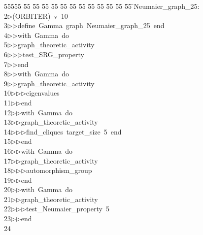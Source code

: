 %
%
\begin{tabbing}
55555 \= 55 \= 55 \= 55 \= 55 \= 55 \= 55 \= 55 \= 55 \= 55 \= 55 \= 55 \= 55 \= \>Neumaier\_graph\_25:\\[0pt]
2\>$\triangleright$\>(ORBITER)\ v\ 10\ \\[0pt]
3\>$\triangleright$\>$\triangleright$\>define\ Gamma\ graph\ Neumaier\_graph\_25\ end\ \\[0pt]
4\>$\triangleright$\>$\triangleright$\>with\ Gamma\ do\ \\[0pt]
5\>$\triangleright$\>$\triangleright$\>graph\_theoretic\_activity\ \\[0pt]
6\>$\triangleright$\>$\triangleright$\>$\triangleright$\>test\_SRG\_property\ \\[0pt]
7\>$\triangleright$\>$\triangleright$\>end\ \\[0pt]
8\>$\triangleright$\>$\triangleright$\>with\ Gamma\ do\ \\[0pt]
9\>$\triangleright$\>$\triangleright$\>graph\_theoretic\_activity\ \\[0pt]
10\>$\triangleright$\>$\triangleright$\>$\triangleright$\>eigenvalues\ \\[0pt]
11\>$\triangleright$\>$\triangleright$\>end\ \\[0pt]
12\>$\triangleright$\>$\triangleright$\>with\ Gamma\ do\ \\[0pt]
13\>$\triangleright$\>$\triangleright$\>graph\_theoretic\_activity\ \\[0pt]
14\>$\triangleright$\>$\triangleright$\>$\triangleright$\>find\_cliques\ target\_size\ 5\ end\ \\[0pt]
15\>$\triangleright$\>$\triangleright$\>end\ \\[0pt]
16\>$\triangleright$\>$\triangleright$\>with\ Gamma\ do\ \\[0pt]
17\>$\triangleright$\>$\triangleright$\>graph\_theoretic\_activity\ \\[0pt]
18\>$\triangleright$\>$\triangleright$\>$\triangleright$\>automorphism\_group\ \\[0pt]
19\>$\triangleright$\>$\triangleright$\>end\ \\[0pt]
20\>$\triangleright$\>$\triangleright$\>with\ Gamma\ do\ \\[0pt]
21\>$\triangleright$\>$\triangleright$\>graph\_theoretic\_activity\ \\[0pt]
22\>$\triangleright$\>$\triangleright$\>$\triangleright$\>test\_Neumaier\_property\ 5\ \\[0pt]
23\>$\triangleright$\>$\triangleright$\>end\\[0pt]
24\>\end{tabbing}
